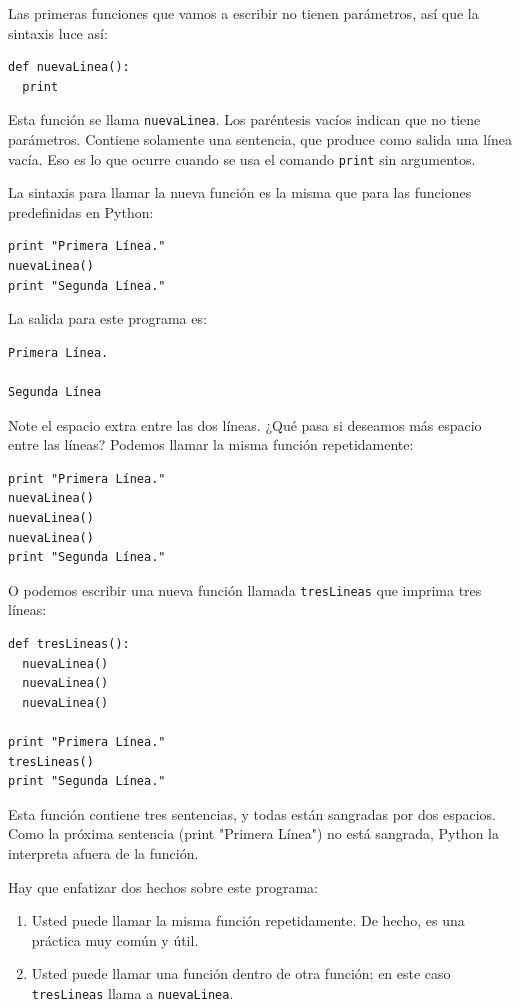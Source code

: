 Las primeras funciones que vamos a escribir no tienen parámetros, así que la
sintaxis luce así:

\beforeverb
\begin{verbatim}
def nuevaLinea():
  print
\end{verbatim}
\afterverb
%
Esta función se llama \texttt{nuevaLinea}.  Los paréntesis vacíos indican que no 
tiene parámetros. Contiene solamente una sentencia, que produce como salida
una línea vacía. Eso es lo que ocurre cuando se usa el comando \texttt{print}
sin argumentos.

La sintaxis para llamar la nueva función es la misma que para las funciones
predefinidas en Python:

\beforeverb
\begin{verbatim}
print "Primera Línea."
nuevaLinea()
print "Segunda Línea."
\end{verbatim}
\afterverb
%
La salida para este programa es:

\beforeverb
\begin{verbatim}
Primera Línea.

Segunda Línea
\end{verbatim}
\afterverb
%
Note el espacio extra entre las dos líneas. ¿Qué pasa si deseamos 
más espacio entre las líneas? Podemos llamar la misma función 
repetidamente:

\beforeverb
\begin{verbatim}
print "Primera Línea."
nuevaLinea()
nuevaLinea()
nuevaLinea()
print "Segunda Línea."
\end{verbatim}
\afterverb
%
O podemos escribir una nueva función llamada \texttt{tresLineas} que imprima
tres líneas:

\beforeverb
\begin{verbatim}
def tresLineas():
  nuevaLinea()
  nuevaLinea()
  nuevaLinea()

print "Primera Línea."
tresLineas()
print "Segunda Línea."
\end{verbatim}
\afterverb
%
Esta función contiene tres sentencias, y todas están sangradas por dos espacios.
Como la próxima sentencia (print "Primera Línea") no está sangrada, Python la
interpreta afuera de la función.

Hay que enfatizar dos hechos sobre este programa:

\begin{enumerate}

\item Usted puede llamar la misma función repetidamente.  De hecho, es una práctica
muy común y útil.

\item Usted puede llamar una función dentro de otra función; en este caso
\texttt{tresLineas} llama a \texttt{nuevaLinea}.

\end{enumerate}

